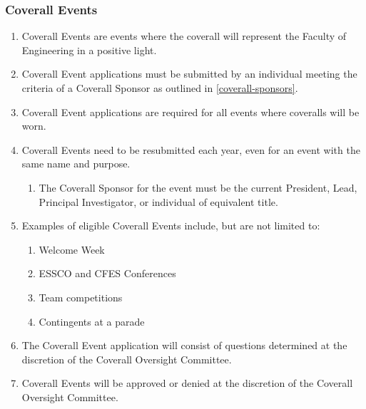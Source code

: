 \subsubsection{Coverall Events}
\label{coverall-events}
\begin{enumerate}
 \item
  Coverall Events are events where the coverall will represent the Faculty of Engineering in a positive light.
 \item
  Coverall Event applications must be submitted by an individual meeting the criteria of a Coverall Sponsor as outlined in \ref{coverall-sponsors}.
 \item
  Coverall Event applications are required for all events where coveralls will be worn.
 \item
  Coverall Events need to be resubmitted each year, even for an event with the same name and purpose.

  \begin{enumerate}
   \item
    The Coverall Sponsor for the event must be the current President, Lead, Principal Investigator, or individual of equivalent title.
  \end{enumerate}
 \item
  Examples of eligible Coverall Events include, but are not limited to:

  \begin{enumerate}
   \item
    Welcome Week
   \item
    ESSCO and CFES Conferences
   \item
    Team competitions
   \item
    Contingents at a parade
  \end{enumerate}
 \item
  The Coverall Event application will consist of questions determined at the discretion of the Coverall Oversight Committee.
 \item
  Coverall Events will be approved or denied at the discretion of the Coverall Oversight Committee.

\end{enumerate}

